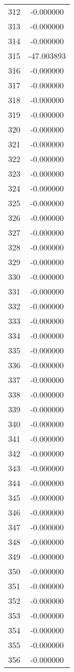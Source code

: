 \documentclass[12pt]{article}
\begin{document}
\begin{longtable}{@{}cc@{}}
312 & -0.000000 \\
313 & -0.000000 \\
314 & -0.000000 \\
315 & -47.003893 \\
316 & -0.000000 \\
317 & -0.000000 \\
318 & -0.000000 \\
319 & -0.000000 \\
320 & -0.000000 \\
321 & -0.000000 \\
322 & -0.000000 \\
323 & -0.000000 \\
324 & -0.000000 \\
325 & -0.000000 \\
326 & -0.000000 \\
327 & -0.000000 \\
328 & -0.000000 \\
329 & -0.000000 \\
330 & -0.000000 \\
331 & -0.000000 \\
332 & -0.000000 \\
333 & -0.000000 \\
334 & -0.000000 \\
335 & -0.000000 \\
336 & -0.000000 \\
337 & -0.000000 \\
338 & -0.000000 \\
339 & -0.000000 \\
340 & -0.000000 \\
341 & -0.000000 \\
342 & -0.000000 \\
343 & -0.000000 \\
344 & -0.000000 \\
345 & -0.000000 \\
346 & -0.000000 \\
347 & -0.000000 \\
348 & -0.000000 \\
349 & -0.000000 \\
350 & -0.000000 \\
351 & -0.000000 \\
352 & -0.000000 \\
353 & -0.000000 \\
354 & -0.000000 \\
355 & -0.000000 \\
356 & -0.000000 \\

\end{longtable}
\end{document}
